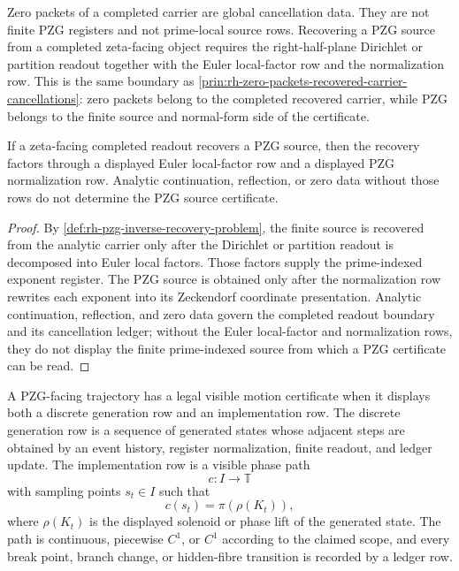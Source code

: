 \begin{principle}
\label{prin:rh-pzg-zero-data-not-source-recovery}
Zero packets of a completed carrier are global cancellation data.  They are
not finite PZG registers and not prime-local source rows.  Recovering a PZG
source from a completed zeta-facing object requires the right-half-plane
Dirichlet or partition readout together with the Euler local-factor row and
the normalization row.  This is the same boundary as
\autoref{prin:rh-zero-packets-recovered-carrier-cancellations}: zero packets
belong to the completed recovered carrier, while PZG belongs to the finite
source and normal-form side of the certificate.
\end{principle}

\begin{theorem}
\label{thm:rh-pzg-inverse-recovery-factors-through-euler-normalized-source}
If a zeta-facing completed readout recovers a PZG source, then the recovery
factors through a displayed Euler local-factor row and a displayed PZG
normalization row.  Analytic continuation, reflection, or zero data without
those rows do not determine the PZG source certificate.
\end{theorem}

\begin{proof}
By \autoref{def:rh-pzg-inverse-recovery-problem}, the finite source is
recovered from the analytic carrier only after the Dirichlet or partition
readout is decomposed into Euler local factors.  Those factors supply the
prime-indexed exponent register.  The PZG source is obtained only after the
normalization row rewrites each exponent into its Zeckendorf coordinate
presentation.  Analytic continuation, reflection, and zero data govern the
completed readout boundary and its cancellation ledger; without the Euler
local-factor and normalization rows, they do not display the finite
prime-indexed source from which a PZG certificate can be read.
\end{proof}

\begin{definition}
\label{def:rh-pzg-legal-visible-motion-certificate}
A PZG-facing trajectory has a legal visible motion certificate when it
displays both a discrete generation row and an implementation row.  The
discrete generation row is a sequence of generated states whose adjacent
steps are obtained by an event history, register normalization, finite
readout, and ledger update.  The implementation row is a visible phase path
$$
c:I\to\mathbb T
$$
with sampling points $s_t\in I$ such that
$$
c(s_t)=\pi(\rho(K_t)),
$$
where $\rho(K_t)$ is the displayed solenoid or phase lift of the generated
state.  The path is continuous, piecewise $C^1$, or $C^1$ according to the
claimed scope, and every break point, branch change, or hidden-fibre
transition is recorded by a ledger row.
\end{definition}

